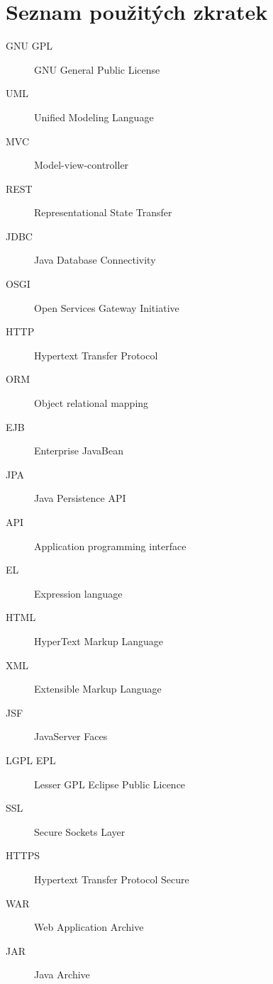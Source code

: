 \documentclass[11pt,twoside,a4paper]{book}
\begin{document}
\appendix
\chapter{Seznam použitých zkratek}

\begin{description}
\item[GNU GPL] GNU General Public License
\item[UML] Unified Modeling Language
\item[MVC] Model-view-controller
\item[REST] Representational State Transfer
\item[JDBC] Java Database Connectivity
\item[OSGI] Open Services Gateway Initiative
\item[HTTP] Hypertext Transfer Protocol
\item[ORM] Object relational mapping
\item[EJB] Enterprise JavaBean
\item[JPA] Java Persistence API
\item[API] Application programming interface
\item[EL] Expression language
\item[HTML] HyperText Markup Language
\item[XML] Extensible Markup Language
\item[JSF] JavaServer Faces
\item[LGPL EPL] Lesser GPL Eclipse Public Licence
\item[SSL] Secure Sockets Layer
\item[HTTPS] Hypertext Transfer Protocol Secure
\item[WAR] Web Application Archive
\item[JAR] Java Archive
\end{description}


\end{document}
